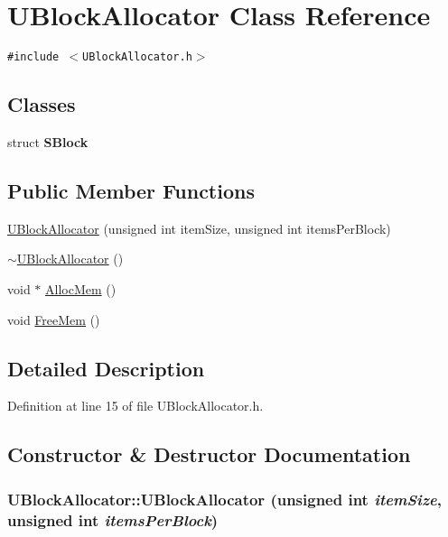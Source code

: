 \hypertarget{class_u_block_allocator}{
\section{UBlockAllocator Class Reference}
\label{class_u_block_allocator}
}
{\tt \#include $<$UBlockAllocator.h$>$}

\subsection*{Classes}
\begin{CompactItemize}
\item 
struct \textbf{SBlock}
\end{CompactItemize}
\subsection*{Public Member Functions}
\begin{CompactItemize}
\item 
\hyperlink{class_u_block_allocator_9e8947d577618bdc70fae3a82d334fa2}{UBlockAllocator} (unsigned int itemSize, unsigned int itemsPerBlock)
\item 
\hyperlink{class_u_block_allocator_572f0a804a5496803aa638168effb723}{$\sim$UBlockAllocator} ()
\item 
void $\ast$ \hyperlink{class_u_block_allocator_f8ab7728bc950b0626577cec829e0d4a}{AllocMem} ()
\item 
void \hyperlink{class_u_block_allocator_d2d64f33591628e1c5f214cd4f6a31cd}{FreeMem} ()
\end{CompactItemize}


\subsection{Detailed Description}


Definition at line 15 of file UBlockAllocator.h.

\subsection{Constructor \& Destructor Documentation}
\hypertarget{class_u_block_allocator_9e8947d577618bdc70fae3a82d334fa2}{
\subsubsection[{UBlockAllocator}]{\setlength{\rightskip}{0pt plus 5cm}UBlockAllocator::UBlockAllocator (unsigned int {\em itemSize}, \/  unsigned int {\em itemsPerBlock})}}
\label{class_u_block_allocator_9e8947d577618bdc70fae3a82d334fa2}




